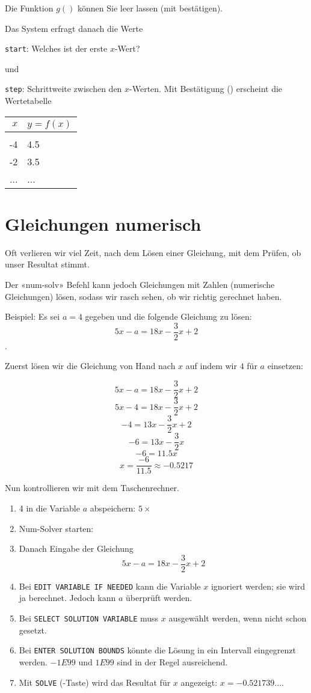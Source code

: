 Die Funktion $g()$ können Sie leer lassen (mit 
bestätigen).

Das System erfragt danach die Werte

\texttt{start}: Welches ist der erste $x$-Wert?

und

\texttt{step}: Schrittweite zwischen den $x$-Werten. Mit Bestätigung
() erscheint die Wertetabelle

\begin{tabular}{r|l}
$x$ & $y=f(x)$\\
\hline\\
-4 & 4.5\\
-2 & 3.5\\
... &  ... \\
\end{tabular}
\newpage


\section{Gleichungen numerisch}\label{numGleichungen}
Oft verlieren wir viel Zeit, nach dem Lösen einer Gleichung, mit dem Prüfen, ob unser Resultat stimmt.

Der «num-solv» Befehl kann jedoch Gleichungen mit Zahlen (numerische Gleichungen) lösen, sodass wir rasch sehen, ob wir richtig gerechnet haben.

Beispiel: Es sei $a=4$ gegeben und die folgende Gleichung zu lösen: $$5x-a = 18x-\frac32x + 2$$.

Zuerst lösen wir die Gleichung von Hand nach $x$ auf indem wir $4$ für $a$ einsetzen:

$$5x-a = 18x -\frac32x + 2$$
$$5x-4 = 18x -\frac32x + 2$$
$$  -4 = 13x -\frac32x + 2$$
$$  -6 = 13x -\frac32x$$
$$  -6 = 11.5x$$
$$ x = \frac{-6}{11.5}\approx{-0.5217}$$

Nun kontrollieren wir mit dem Taschenrechner.

\begin{enumerate}
\item 4 in die Variable $a$ abspeichern:   $5\times$
\item Num-Solver starten:  
\item Danach Eingabe der Gleichung
$$5x-a = 18x -\frac32x + 2$$
\item Bei \texttt{EDIT VARIABLE IF NEEDED} kann die Variable $x$ ignoriert werden; sie wird ja berechnet. Jedoch kann $a$ überprüft werden.
\item Bei \texttt{SELECT SOLUTION VARIABLE} muss $x$ ausgewählt werden, wenn nicht schon gesetzt.
\item Bei \texttt{ENTER SOLUTION BOUNDS} könnte die Lösung in ein Intervall eingegrenzt werden. $-1E99$ und $1E99$ sind in der Regel ausreichend.
\item Mit \texttt{SOLVE} (-Taste) wird das Resultat für $x$ angezeigt: $x = -0.521739...$.
\end{enumerate}




